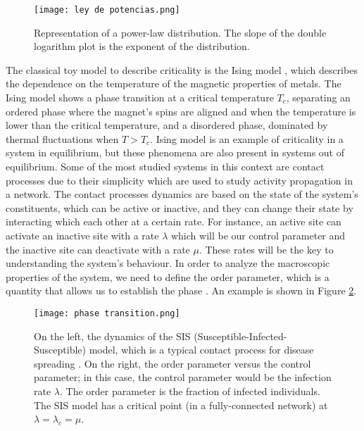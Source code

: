 \begin{figure}[H]
\centering
\texttt{[image: ley de potencias.png]}
\caption{Representation of a power-law distribution. The slope of the double logarithm plot is the exponent of the distribution.}
\label{f:ley de pot}
\end{figure}

The classical toy model to describe criticality is the Ising model \cite{ising1925}, which describes the dependence on the temperature of the magnetic properties of metals. The Ising model 
shows a phase transition at a critical temperature $T_c$, separating
an ordered phase where the magnet's spins are aligned and when the temperature is lower than the critical temperature, and a disordered phase,
dominated by thermal fluctuations when $T>T_c$. Ising model is an example of criticality in a system in equilibrium, but these phenomena are also present in systems out of equilibrium. 
Some of the most studied systems in this context are contact processes due to their simplicity which are used to study activity propagation in a network.
The contact processes dynamics are based on the state of the system's constituents, which can be active or inactive, and they can change their state by interacting which 
each other at a certain rate. For instance, an active site can activate
an inactive site with a rate $\lambda$ which will be our control parameter and the inactive site can deactivate with a rate $\mu$. 
These rates will be the key to understanding the system's behaviour. In order to analyze the macroscopic properties of the system, we need to define the order parameter, 
which is a quantity that allows us to establish the phase \cite{wilting201925}. An example is shown in Figure \ref{f:order_parameter}.

\begin{figure}[H]
    \centering
    \texttt{[image: phase transition.png]}
    \caption{On the left, the dynamics of the SIS (Susceptible-Infected-Susceptible) model, which is a typical contact process for disease spreading \cite{pastor2015epidemic}. 
    On the right, the order parameter versus 
    the control parameter; in this case, the control parameter would be the infection rate $\lambda$. The order parameter is the fraction of infected individuals. 
    The SIS model has a critical point (in a fully-connected network) at $\lambda=\lambda_c=\mu$.}
    \label{f:order_parameter}
\end{figure}


